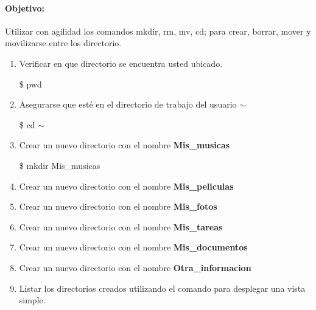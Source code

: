 \documentclass[a4paper,12pt,spanish]{article}
\begin{document}
\paragraph{Objetivo:}
Utilizar con agilidad los comandos mkdir, rm, mv, cd;  para crear, borrar, mover y movilizarse entre los directorio.


\begin{enumerate}
  \item Verificar en que directorio se encuentra usted ubicado.
  \begin{tcolorbox}[colback=gray!5]
   \$ pwd
  \end{tcolorbox}
  \item Asegurarse que esté en el directorio de trabajo del  usuario  {\Large $\sim$} 
  \begin{tcolorbox}[colback=gray!5]
   \$ cd $\sim$
 \end{tcolorbox}
 \begin{shadedbox}
   \textcolor{white}{{\large {}}}
   \end{shadedbox}

 


  \item Crear un nuevo directorio con el nombre \textbf{Mis\_musicas}
  \begin{tcolorbox}[colback=red!5!white,colframe=red!75!black,fonttitle=\bfseries]
    \$ mkdir Mis\_musicas
  \end{tcolorbox}
  \item Crear un nuevo directorio con el nombre \textbf{Mis\_peliculas}
  \item Crear un nuevo directorio con el nombre \textbf{Mis\_fotos}
  \item Crear un nuevo directorio con el nombre \textbf{Mis\_tareas}
  \item Crear un nuevo directorio con el nombre \textbf{Mis\_documentos}
  \item Crear un nuevo directorio con el nombre \textbf{Otra\_informacion}
  
  \item Listar los directorios creados utilizando el comando para desplegar una vista simple.
  \begin{tcolorbox}[colback=red!5!white,colframe=red!75!black,fonttitle=\bfseries]


\end{tcolorbox}
\end{enumerate}
\end{document}
